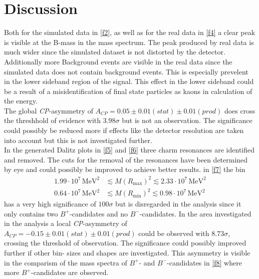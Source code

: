 \section{Discussion}
\label{sec:Diskussion}
Both for the simulated data in \autoref{f2}, as well as for the real data in \autoref{f4} a clear peak is visible at the B-mass in the
mass spectrum. The peak produced by real data is much wider since the simulated dataset is not distorted by the detector. Additionally
more Background events are visible in the real data since the simulated data does not contain background events. This is especially
prevelent in the lower sideband region of the signal. This effect in the lower sideband could be a result of a misidentification of final state
particles as kaons in calculation of the energy. \\
The global \textit{CP}-asymmetry of $A_\textit{CP} = 0.05 \pm 0.01 (stat) \pm 0.01 (prod)$ does cross the threshhold of evidence with $3.98 \sigma$
but is not an observation. The significance
could possibly be reduced more if effects like the detector resolution are taken into account but this is not investigated further. \\
In the generated Dalitz plots in \autoref{f5} and \ref{f6} three charm resonances are identified and removed. The cuts for the
removal of the resonances have been determined by eye and could possibly be improved to achieve better results.
in \autoref{f7} the bin
\begin{align*}
    1.99 \cdot 10^{7} \, \si{\mega\eV\squared} &\lesssim M(R_\text{max})^2 \lesssim 2.33 \cdot 10^{7} \, \si{\mega\eV\squared} \\
    0.64 \cdot 10^{7} \, \si{\mega\eV\squared} &\lesssim M(R_\text{min})^2 \lesssim 0.98 \cdot 10^{7} \, \si{\mega\eV\squared}
\end{align*}
has a very high significance of $100 \sigma$ but is disregarded in the analysis since it only contains two $B^+$-candidates and no $B^-$-candidates.
In the area investigated in the analysis a local \textit{CP}-asymmetry of $A_\textit{CP} = -0.15  \pm 0.01  (stat)  \pm 0.01(prod)$ could be observed
with $8.73 \sigma$, crossing the threshold of observation. The significance could possibly improved further if other bin- sizes and shapes are
investigated. This asymmetry is visible in the comparism of the mass spectra of $B^+$- and $B^-$-candidates in \autoref{f8} where more
$B^+$-candidates are observed.
